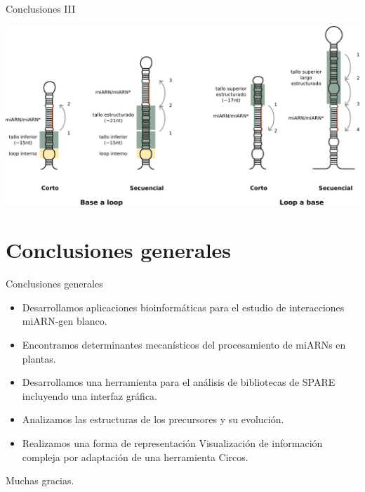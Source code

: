 \documentclass{beamer}
\begin{document}
\begin{frame}{Conclusiones III}
	\begin{center}
		\includegraphics[width=1\textwidth]{img/mecanismos_conclusionIII.png}
	\end{center}
\end{frame}


\section{Conclusiones generales}

\begin{frame}{Conclusiones generales}
	\begin{itemize}
        \item<1-> Desarrollamos aplicaciones bioinformáticas para el estudio de interacciones miARN-gen blanco.
        \item<2-> Encontramos determinantes mecanísticos del procesamiento de miARNs en plantas.
        \item<3-> Desarrollamos una herramienta para el análisis de bibliotecas de SPARE incluyendo una interfaz gráfica.
        \item<4-> Analizamos las estructuras de los precursores y su evolución.
        \item<5-> Realizamos una forma de representación Visualización de información compleja por adaptación de una herramienta Circos.
    \end{itemize}
\end{frame}


\begin{frame}{}
	\begin{center}
		\Huge Muchas gracias.
	\end{center}
\end{frame}
\end{document}
